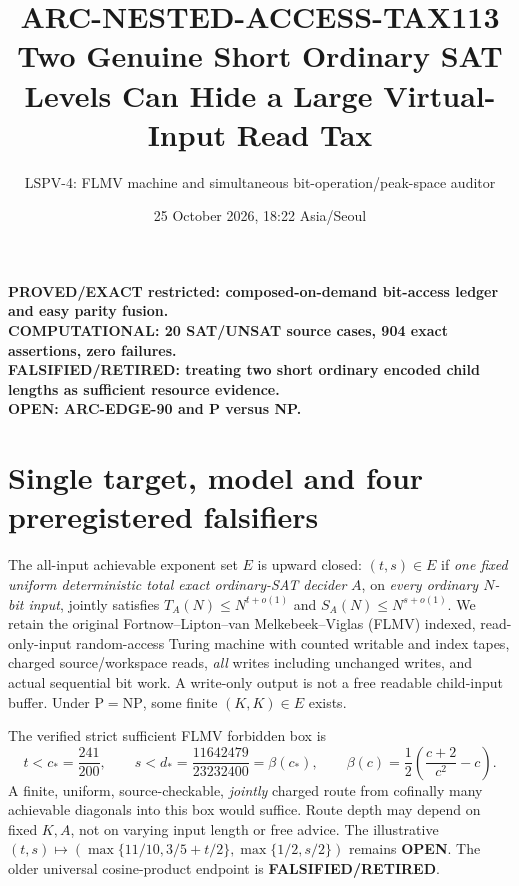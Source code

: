 \documentclass[11pt]{article}
\title{ARC-NESTED-ACCESS-TAX113\\
\large Two Genuine Short Ordinary SAT Levels Can Hide a Large Virtual-Input Read Tax}
\author{LSPV-4: FLMV machine and simultaneous bit-operation/peak-space auditor}
\date{25 October 2026, 18:22 Asia/Seoul}
\newcommand{\OPEN}{\textbf{OPEN}}
\begin{document}
\maketitle
\begin{center}
\textbf{PROVED/EXACT restricted: composed-on-demand bit-access ledger and easy parity fusion.}\\
\textbf{COMPUTATIONAL: 20 SAT/UNSAT source cases, 904 exact assertions, zero failures.}\\
\textbf{FALSIFIED/RETIRED: treating two short ordinary encoded child lengths as sufficient resource evidence.}\\
\textbf{OPEN: ARC-EDGE-90 and P versus NP.}
\end{center}

\section{Single target, model and four preregistered falsifiers}
The all-input achievable exponent set \(E\) is upward closed: \((t,s)\in E\)
if \emph{one fixed uniform deterministic total exact ordinary-SAT decider}
\(A\), on \emph{every ordinary \(N\)-bit input}, jointly satisfies
\(T_A(N)\le N^{t+o(1)}\) and \(S_A(N)\le N^{s+o(1)}\).
We retain the original Fortnow--Lipton--van Melkebeek--Viglas (FLMV)
indexed, read-only-input random-access Turing machine with counted writable
and index tapes, charged source/workspace reads, \emph{all} writes including
unchanged writes, and actual sequential bit work. A write-only output is not a
free readable child-input buffer. Under \(\mathrm P=\mathrm{NP}\), some finite
\((K,K)\in E\) exists.

The verified strict sufficient FLMV forbidden box is
\[
t<c_*=\frac{241}{200},\qquad
s<d_*=\frac{11642479}{23232400}=\beta(c_*),\qquad
\beta(c)=\frac12\left(\frac{c+2}{c^2}-c\right).
\]
A finite, uniform, source-checkable, \emph{jointly} charged route from
cofinally many achievable diagonals into this box would suffice. Route depth
may depend on fixed \(K,A\), not on varying input length or free advice.
The illustrative \( (t,s)\mapsto
(\max\{11/10,3/5+t/2\},\max\{1/2,s/2\})\)
remains \OPEN. The older universal cosine-product endpoint is
\textbf{FALSIFIED/RETIRED}.
\end{document}
